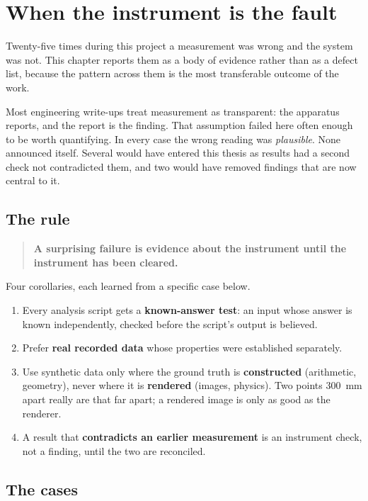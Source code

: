 \chapter{When the instrument is the fault}
\label{ch:instrument}

Twenty-five times during this project a measurement was wrong and the system
was not. This chapter reports them as a body of evidence rather than as a
defect list, because the pattern across them is the most transferable outcome
of the work.

Most engineering write-ups treat measurement as transparent: the apparatus
reports, and the report is the finding. That assumption failed here often
enough to be worth quantifying. In every case the wrong reading was
\emph{plausible}. None announced itself. Several would have entered this
thesis as results had a second check not contradicted them, and two would have
removed findings that are now central to it.

\section{The rule}

\begin{quote}
\textbf{A surprising failure is evidence about the instrument until the
instrument has been cleared.}
\end{quote}

Four corollaries, each learned from a specific case below.

\begin{enumerate}
  \item Every analysis script gets a \textbf{known-answer test}: an input whose
    answer is known independently, checked before the script's output is
    believed.
  \item Prefer \textbf{real recorded data} whose properties were established
    separately.
  \item Use synthetic data only where the ground truth is \textbf{constructed}
    (arithmetic, geometry), never where it is \textbf{rendered} (images,
    physics). Two points \SI{300}{\milli\metre} apart really are that far
    apart; a rendered image is only as good as the renderer.
  \item A result that \textbf{contradicts an earlier measurement} is an
    instrument check, not a finding, until the two are reconciled.
\end{enumerate}

\section{The cases}

